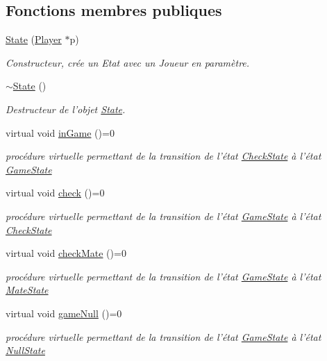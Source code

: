 \subsection*{Fonctions membres publiques}
\begin{DoxyCompactItemize}
\item 
\hyperlink{class_state_a7a0a6af0cd97aa575a097eca87e090ba}{State} (\hyperlink{class_player}{Player} $\ast$p)
\begin{DoxyCompactList}\small\item\em Constructeur, crée un Etat avec un Joueur en paramètre. \end{DoxyCompactList}\item 
\hyperlink{class_state_afab438d92b90dc18d194dbd9c9c8bab3}{$\sim$\-State} ()
\begin{DoxyCompactList}\small\item\em Destructeur de l'objet \hyperlink{class_state}{State}. \end{DoxyCompactList}\item 
virtual void \hyperlink{class_state_a738b04d6e0c12a39bf96a2a7159202d8}{in\-Game} ()=0
\begin{DoxyCompactList}\small\item\em procédure virtuelle permettant de la transition de l'état \hyperlink{class_check_state}{Check\-State} à l'état \hyperlink{class_game_state}{Game\-State} \end{DoxyCompactList}\item 
virtual void \hyperlink{class_state_a321fd726bbefc35fedbbf001d2a37021}{check} ()=0
\begin{DoxyCompactList}\small\item\em procédure virtuelle permettant de la transition de l'état \hyperlink{class_game_state}{Game\-State} à l'état \hyperlink{class_check_state}{Check\-State} \end{DoxyCompactList}\item 
virtual void \hyperlink{class_state_aa2b89ec92ecd4f6271269fe4b8ccc790}{check\-Mate} ()=0
\begin{DoxyCompactList}\small\item\em procédure virtuelle permettant de la transition de l'état \hyperlink{class_game_state}{Game\-State} à l'état \hyperlink{class_mate_state}{Mate\-State} \end{DoxyCompactList}\item 
virtual void \hyperlink{class_state_ad5b7fe10b2c30243f36d7d0950c50d43}{game\-Null} ()=0
\begin{DoxyCompactList}\small\item\em procédure virtuelle permettant de la transition de l'état \hyperlink{class_game_state}{Game\-State} à l'état \hyperlink{class_null_state}{Null\-State} \end{DoxyCompactList}\item 

\end{DoxyCompactItemize}
